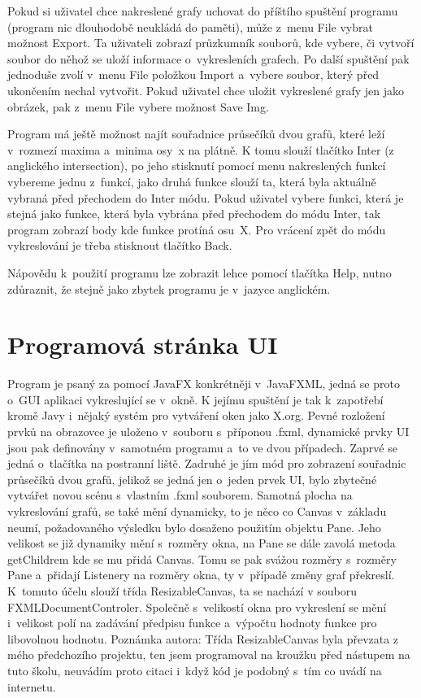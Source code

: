 \documentclass[a4paper,oneside,12p]{report}
\begin{document}
Pokud si uživatel chce nakreslené grafy uchovat do příštího spuštění programu (program nic dlouhodobě neukládá do paměti), může z~menu File vybrat možnost Export.
Ta uživateli zobrazí průzkumník souborů, kde vybere, či vytvoří soubor do něhož se uloží informace o~vykresleních grafech.
Po další spuštění pak jednoduše zvolí v~menu File položkou Import a~vybere soubor, který před ukončením nechal vytvořit.
Pokud uživatel chce uložit vykreslené grafy jen jako obrázek, pak z~menu File vybere možnost Save Img.

Program má ještě možnost najít souřadnice průsečíků dvou grafů, které leží v~rozmezí maxima a~minima osy~x na plátně.
K tomu slouží tlačítko Inter (z anglického intersection), po jeho stisknutí pomocí menu nakreslených funkcí vybereme jednu z~funkcí, jako druhá funkce slouží ta, která byla aktuálně vybraná před přechodem do Inter módu.
Pokud uživatel vybere funkci, která je stejná jako funkce, která byla vybrána před přechodem do módu Inter, tak program zobrazí body kde funkce protíná osu~X.
Pro vrácení zpět do módu vykreslování je třeba stisknout tlačítko Back.

Nápovědu k~použití programu lze zobrazit lehce pomocí tlačítka Help, nutno zdůraznit, že stejně jako zbytek programu je v~jazyce anglickém.

\section{Programová stránka UI}

Program je psaný za pomocí JavaFX konkrétněji v~JavaFXML, jedná se proto o~GUI aplikaci vykreslující se v~okně.
K jejímu spuštění je tak k~zapotřebí kromě Javy i~nějaký systém pro vytváření oken jako X.org.
Pevné rozložení prvků na obrazovce je uloženo v~souboru s~příponou .fxml, dynamické prvky UI jsou pak definovány v~samotném programu a~to ve dvou případech.
Zaprvé se jedná o~tlačítka na postranní liště.
Zadruhé je jím mód pro zobrazení souřadnic průsečíků dvou grafů, jelikož se jedná jen o~jeden prvek UI, bylo zbytečné vytvářet novou scénu s~vlastním .fxml souborem.
Samotná plocha na vykreslování grafů, se také mění dynamicky, to je něco co Canvas v~základu neumí, požadovaného výsledku bylo dosaženo použitím objektu Pane.
Jeho velikost se již dynamiky mění s~rozměry okna, na Pane se dále zavolá metoda getChildrem kde se mu přidá Canvas.
Tomu se pak svážou rozměry s~rozměry Pane a~přidají Listenery na rozměry okna, ty v~případě změny graf překreslí.
K~tomuto účelu slouží třída ResizableCanvas, ta se nachází v souboru FXMLDocumentControler.
Společně s~velikostí okna pro vykreslení se mění i~velikost polí na zadávání předpisu funkce a~výpočtu hodnoty funkce pro libovolnou hodnotu.
Poznámka autora: Třída ResizableCanvas byla převzata z mého předchozího projektu, ten jsem programoval na kroužku před nástupem na tuto školu, neuvádím proto citaci i~když kód je podobný s~tím co uvádí na internetu.
\end{document}
